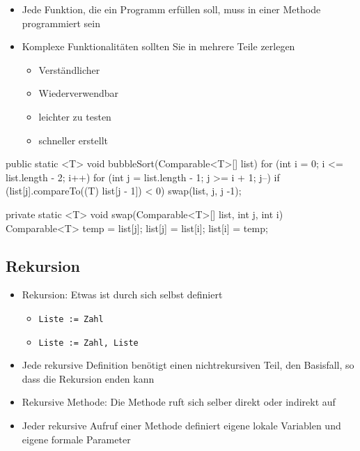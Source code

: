 \documentclass[a4paper,10pt, dvipsnames]{report}
\begin{document}
\begin{itemize}
	\item Jede Funktion, die ein Programm erfüllen soll, muss in einer Methode programmiert sein
	\item Komplexe Funktionalitäten sollten Sie in mehrere Teile zerlegen
	\begin{itemize}
        \item Verständlicher
        \item Wiederverwendbar
        \item leichter zu testen
        \item schneller erstellt
    \end{itemize}
\end{itemize}

\begin{javacodebox}
public static <T> void bubbleSort(Comparable<T>[] list) {
    for (int i = 0; i <= list.length - 2; i++)
        for (int j = list.length - 1; j >= i + 1; j--)
            if (list[j].compareTo((T) list[j - 1]) < 0)
                swap(list, j, j -1);
}

private static <T> void swap(Comparable<T>[] list, int j, int i) {
    Comparable<T> temp = list[j];
    list[j] = list[i];
    list[i] = temp;
}
\end{javacodebox}

\subsection{Rekursion}

\begin{itemize}
	\item Rekursion: Etwas ist durch sich selbst definiert
	\begin{itemize}
        \item \texttt{Liste := Zahl}
	    \item \texttt{Liste := Zahl, Liste}
    \end{itemize}
	\item Jede rekursive Definition benötigt einen nichtrekursiven Teil, den Basisfall, so dass die Rekursion enden kann
	\item Rekursive Methode: Die Methode ruft sich selber direkt oder indirekt auf
	\item Jeder rekursive Aufruf einer Methode definiert eigene lokale Variablen und eigene formale Parameter
\end{itemize}
\end{document}
